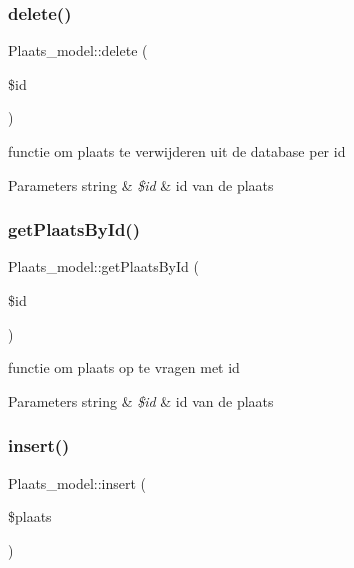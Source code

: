 \subsubsection{\texorpdfstring{delete()}{delete()}}
{\footnotesize\ttfamily Plaats\+\_\+model\+::delete (\begin{DoxyParamCaption}\item[{}]{\$id }\end{DoxyParamCaption})}

functie om plaats te verwijderen uit de database per id 
\begin{DoxyParams}[1]{Parameters}
string & {\em \$id} & id van de plaats \\
\hline
\end{DoxyParams}
\mbox{\label{class_plaats__model_ad74fde1e8efdd97f181c649e8d869590}} 
\subsubsection{\texorpdfstring{get\+Plaats\+By\+Id()}{getPlaatsById()}}
{\footnotesize\ttfamily Plaats\+\_\+model\+::get\+Plaats\+By\+Id (\begin{DoxyParamCaption}\item[{}]{\$id }\end{DoxyParamCaption})}

functie om plaats op te vragen met id 
\begin{DoxyParams}[1]{Parameters}
string & {\em \$id} & id van de plaats \\
\hline
\end{DoxyParams}
\mbox{\label{class_plaats__model_a708c9f18b63ac2655c6121e63b5ffe7f}} 
\subsubsection{\texorpdfstring{insert()}{insert()}}
{\footnotesize\ttfamily Plaats\+\_\+model\+::insert (\begin{DoxyParamCaption}\item[{}]{\$plaats }\end{DoxyParamCaption})}

